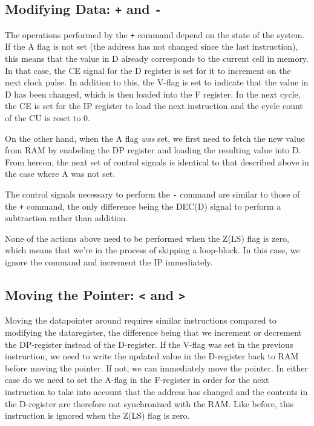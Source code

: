 \subsection{Modifying Data: \texttt{+} and \texttt{-}}
The operations performed by the \texttt{+} command depend on the state of the system. If the A flag is not set (the address has not changed since the last instruction), this means that the value in D already corresponds to the current cell in memory. In that case, the CE signal for the D register is set for it to increment on the next clock pulse. In addition to this, the V-flag is set to indicate that the value in D has been changed, which is then loaded into the F register. In the next cycle, the CE is set for the IP register to load the next instruction and the cycle count of the CU is reset to 0.

On the other hand, when the A flag \emph{was} set, we first need to fetch the new value from RAM by enabeling the DP register and loading the resulting value into D. From hereon, the next set of control signals is identical to that described above in the case where A was not set.

The control signals necessary to perform the \texttt{-} command are similar to those of the \texttt{+} command, the only difference being the DEC(D) signal to perform a subtraction rather than addition.

None of the actions above need to be performed when the Z(LS) flag is zero, which means that we're in the process of skipping a loop-block. In this case, we ignore the command and increment the IP immediately.

\subsection{Moving the Pointer: \texttt{<} and \texttt{>}}
Moving the datapointer around requires similar instructions compared to modifying the dataregister, the difference being that we increment or decrement the DP-register instead of the D-register. If the V-flag was set in the previous instruction, we need to write the updated value in the D-register back to RAM before moving the pointer. If not, we can immediately move the pointer. In either case do we need to set the A-flag in the F-register in order for the next instruction to take into account that the address has changed and the contents in the D-register are therefore not synchronized with the RAM. Like before, this instruction is ignored when the Z(LS) flag is zero.

